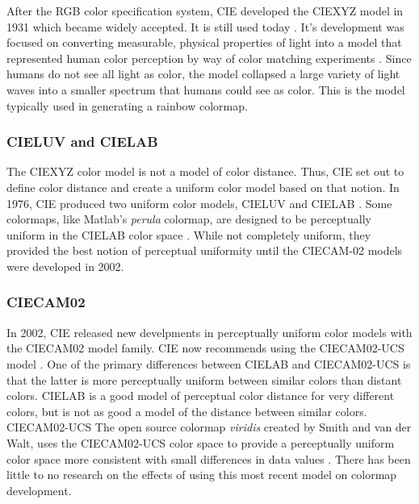 \documentclass[journal]{IEEEtran}
\begin{document}
After the RGB color specification system, CIE developed the CIEXYZ model in 1931
which became widely accepted. It is still used today \cite{viridis}. It's development was 
focused on converting measurable, physical properties of light into a model
that represented human color perception by way of color matching experiments 
\cite{colorimetry}.
Since humans do not see all light 
as color, the model collapsed a large variety of light waves into a smaller 
spectrum that humans could see as color. This is the model typically used in 
generating a rainbow colormap.

\subsubsection{CIELUV and CIELAB}

The CIEXYZ color model is not a model of color distance. Thus, CIE set out to
define color distance and create a uniform color model based on that notion.
In 1976, CIE produced two uniform color models, CIELUV and CIELAB \cite{colorimetry}. Some colormaps,
like Matlab's \textit{perula} colormap, are designed to be perceptually
uniform in the CIELAB color space \cite{viridis}. While not 
completely uniform, they provided the best notion of perceptual uniformity until
the CIECAM-02 models were developed in 2002.

\subsubsection{CIECAM02}

In 2002, CIE released new develpments in perceptually uniform color models with
the CIECAM02 model family. CIE now recommends using the CIECAM02-UCS model 
\cite{ciecam02}.
One of the primary differences between CIELAB and CIECAM02-UCS is that the latter
is more perceptually uniform between similar colors than distant colors. CIELAB
is a good model of perceptual color distance for very different colors, but 
is not as good a model of the distance between similar colors.
CIECAM02-UCS The open source colormap \textit{viridis} created by Smith and van der Walt, uses
the CIECAM02-UCS color space to provide a perceptually uniform color space more
consistent with small differences in data values \cite{viridis}. There has been
little to no research on the effects of using this most recent model on colormap
development.



%



\end{document}
